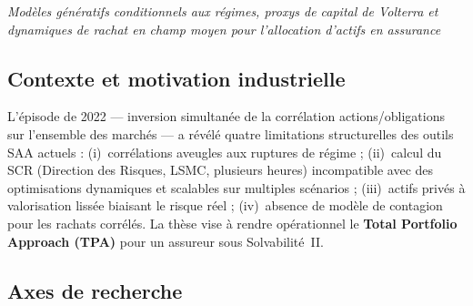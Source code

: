 \documentclass[10pt,a4paper]{article}
\begin{document}
\begin{center}
  \itshape
  Modèles génératifs conditionnels aux régimes, proxys de capital de Volterra
  et dynamiques de rachat en champ moyen pour l'allocation d'actifs en assurance
\end{center}

\subsection{Contexte et motivation industrielle}

L'épisode de 2022 --- inversion simultanée de la corrélation
actions/obligations sur l'ensemble des marchés --- a révélé quatre
limitations structurelles des outils SAA actuels :
(i)~corrélations aveugles aux ruptures de régime ;
(ii)~calcul du SCR (Direction des Risques, LSMC, plusieurs heures)
incompatible avec des optimisations dynamiques et scalables sur
multiples scénarios ;
(iii)~actifs privés à valorisation lissée biaisant le risque réel ;
(iv)~absence de modèle de contagion pour les rachats corrélés.
La thèse vise à rendre opérationnel le \textbf{Total Portfolio Approach (TPA)}
pour un assureur sous Solvabilité~II.

\subsection{Axes de recherche}
\end{document}
